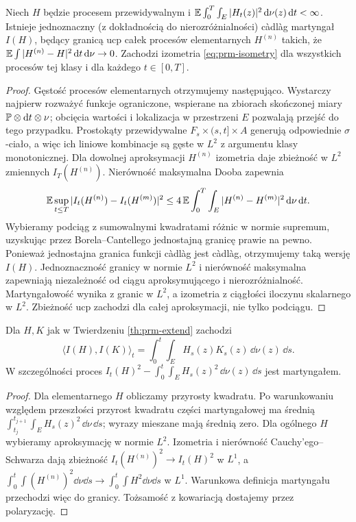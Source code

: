 \begin{twierdzenie}
\label{th:prm-extend}
Niech $H$ będzie procesem przewidywalnym i
$\mathbb{E}\int_0^T\int_E |H_t(z)|^2\,\mathrm{d}\nu(z)\,\mathrm{d} t<\infty$.
Istnieje jednoznaczny (z dokładnością do nierozróżnialności)
càdlàg martyngał $I(H)$, będący granicą ucp całek
procesów elementarnych $H^{(n)}$ takich, że
$\mathbb{E}\int|H^{(n)}-H|^2\,\mathrm{d} t\,\mathrm{d}\nu\to0$.
Zachodzi izometria \eqref{eq:prm-isometry} dla wszystkich
procesów tej klasy i dla każdego $t\in[0,T]$.
\end{twierdzenie}
\begin{proof}
Gęstość procesów elementarnych otrzymujemy następująco.
Wystarczy najpierw rozważyć funkcje ograniczone, wspierane
na zbiorach skończonej miary $\mathbb{P}\otimes\mathrm{d} t\otimes\nu$;
obcięcia wartości i lokalizacja w przestrzeni $E$ pozwalają
przejść do tego przypadku. Prostokąty przewidywalne
$F_s\times(s,t]\times A$ generują odpowiednie $\sigma$-ciało,
a więc ich liniowe kombinacje są gęste w $L^2$ z
argumentu klasy monotonicznej. Dla dowolnej aproksymacji
$H^{(n)}$ izometria daje zbieżność w $L^2$ zmiennych
$I_T(H^{(n)})$. Nierówność maksymalna Dooba zapewnia
\[
\mathbb{E}\sup_{t\le T}|I_t(H^{(n)})-I_t(H^{(m)})|^2
\le4\,\mathbb{E}\int_0^T\int_E|H^{(n)}-H^{(m)}|^2
\,\mathrm{d}\nu\,\mathrm{d} t.
\]
Wybieramy podciąg z sumowalnymi kwadratami różnic
w normie supremum, uzyskując przez Borela--Cantellego
jednostajną granicę prawie na pewno. Ponieważ jednostajna
granica funkcji càdlàg jest càdlàg, otrzymujemy taką
wersję $I(H)$. Jednoznaczność granicy w normie $L^2$
i nierówność maksymalna zapewniają niezależność od ciągu
aproksymującego i nierozróżnialność. Martyngałowość
wynika z granic w $L^2$, a izometria z ciągłości iloczynu
skalarnego w $L^2$. Zbieżność ucp zachodzi dla całej
aproksymacji, nie tylko podciągu.
\end{proof}

\begin{wniosek}
\label{cor:prm-angle}
Dla $H,K$ jak w Twierdzeniu \ref{th:prm-extend} zachodzi
\[
\langle I(H),I(K)\rangle_t
=\int_0^t\int_EH_s(z)K_s(z)\,\dd\nu(z)\,\dd s.
\]
W szczególności proces $I_t(H)^2-\int_0^t\int_EH_s(z)^2
\,\dd\nu(z)\,\dd s$ jest martyngałem.
\end{wniosek}
\begin{proof}
Dla elementarnego $H$ obliczamy przyrosty kwadratu.
Po warunkowaniu względem przeszłości przyrost kwadratu
części martyngałowej ma średnią
$\int_{t_j}^{t_{j+1}}\int_EH_s(z)^2\,\dd\nu\,\dd s$;
wyrazy mieszane mają średnią zero. Dla ogólnego $H$
wybieramy aproksymację w normie $L^2$. Izometria i
nierówność Cauchy'ego--Schwarza dają zbieżność
$I_t(H^{(n)})^2\to I_t(H)^2$ w $L^1$, a
$\int_0^t\int(H^{(n)})^2\dd\nu\dd s\to
\int_0^t\int H^2\dd\nu\dd s$ w $L^1$.
Warunkowa definicja martyngału przechodzi więc do granicy.
Tożsamość z kowariacją dostajemy przez polaryzację.
\end{proof}

